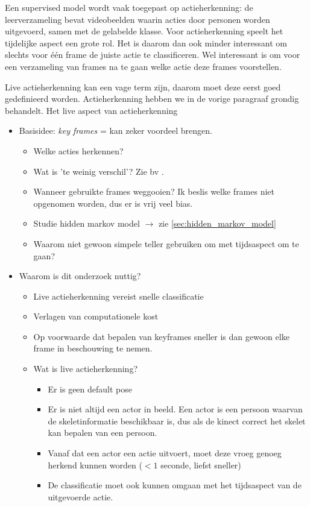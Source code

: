 Een supervised model wordt vaak toegepast op actieherkenning: de leerverzameling bevat videobeelden waarin acties door personen worden uitgevoerd, samen met de gelabelde klasse. Voor actieherkenning speelt het tijdelijke aspect een grote rol. Het is daarom dan ook minder interessant om slechts voor één frame de juiste actie te classificeren. Wel interessant is om voor een verzameling van frames na te gaan welke actie deze frames voorstellen. 


Live actieherkenning kan een vage term zijn, daarom moet deze eerst goed gedefinieerd worden. Actieherkenning hebben we in de vorige paragraaf grondig behandelt. Het live aspect van actieherkenning 

\begin{itemize}
	\item Basisidee: \textit{key frames} = kan zeker voordeel brengen.
	
	\begin{itemize}
		\item Welke acties herkennen?  
		\item Wat is 'te weinig verschil'? Zie bv \cite{Suolan2017}.
		\item Wanneer gebruikte frames weggooien? Ik beslis welke frames niet opgenomen worden, dus er is vrij veel bias.
		\item Studie hidden markov model $\rightarrow$ zie \ref{sec:hidden_markov_model}
		\item Waarom niet gewoon simpele teller gebruiken om met tijdsaspect om te gaan?
	\end{itemize}

	\item Waarom is dit onderzoek nuttig? 
	\begin{itemize}
		\item Live actieherkenning vereist snelle classificatie
		\item Verlagen van computationele kost
		\item Op voorwaarde dat bepalen van keyframes sneller is dan gewoon elke frame in beschouwing te nemen. 
		\item Wat is live actieherkenning? 
		\begin{itemize}
			\item Er is geen default pose
			\item Er is niet altijd een actor in beeld. Een actor is een persoon waarvan de skeletinformatie beschikbaar is, dus als de kinect correct het skelet kan bepalen van een persoon.
			\item Vanaf dat een actor een actie uitvoert, moet deze vroeg genoeg herkend kunnen worden ($< 1$ seconde, liefst sneller)
			\item De classificatie moet ook kunnen omgaan met het tijdsaspect van de uitgevoerde actie.
		\end{itemize}
	\end{itemize}


\end{itemize}
